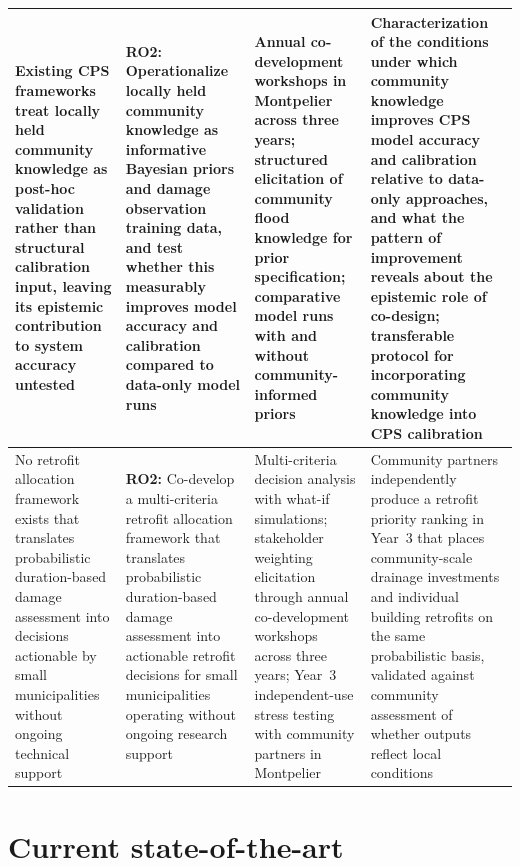 \documentclass[11pt]{article}
\begin{document}
\begin{tabularx}{\textwidth}{|X|X|X|X|}
\hline
Existing CPS frameworks treat locally held community knowledge as post-hoc validation
rather than structural calibration input, leaving its epistemic contribution to system
accuracy untested &
\textbf{RO2:} Operationalize locally held community knowledge as informative Bayesian
priors and damage observation training data, and test whether this measurably improves
model accuracy and calibration compared to data-only model runs &
Annual co-development workshops in Montpelier across three years; structured
elicitation of community flood knowledge for prior specification; comparative model
runs with and without community-informed priors &
Characterization of the conditions under which community knowledge improves CPS
model accuracy and calibration relative to data-only approaches, and what the pattern
of improvement reveals about the epistemic role of co-design; transferable protocol
for incorporating community knowledge into CPS calibration \\
\hline
No retrofit allocation framework exists that translates probabilistic duration-based
damage assessment into decisions actionable by small municipalities without ongoing
technical support &
\textbf{RO2:} Co-develop a multi-criteria retrofit allocation framework that translates
probabilistic duration-based damage assessment into actionable retrofit decisions for
small municipalities operating without ongoing research support &
Multi-criteria decision analysis with what-if simulations; stakeholder weighting
elicitation through annual co-development workshops across three years; Year~3
independent-use stress testing with community partners in Montpelier &
Community partners independently produce a retrofit priority ranking in Year~3 that
places community-scale drainage investments and individual building retrofits on the
same probabilistic basis, validated against community assessment of whether outputs
reflect local conditions \\
\end{tabularx}
\endgroup
\normalsize


\vspace{-5pt}

\vspace{-5pt}
\section{Current state-of-the-art}
\end{document}
